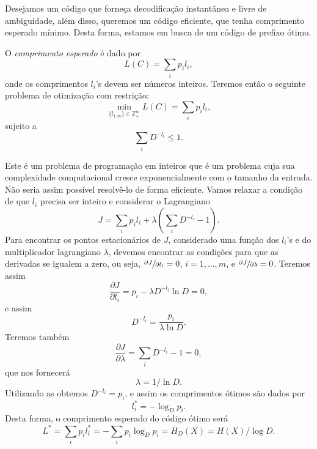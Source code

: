 Desejamos um código que forneça decodificação instantânea e livre de
ambiguidade, além disso, queremos um código eficiente, que tenha comprimento
esperado mínimo. Desta forma, estamos em busca de um código de prefixo ótimo.

O \emph{comprimento esperado} é dado por
\begin{equation}
  L(C) = \sum_{i} p_i l_i ,
\end{equation}
onde os comprimentos $l_i$'s devem ser números inteiros.
Teremos então o seguinte problema de otimização com restrição:
\begin{equation}
  \min_{\{l_{1:m}\} \in \mathbb{Z}_{+}^m} L(C) = \sum_i p_i l_i ,
\end{equation}
sujeito a
\begin{equation}
  \sum_i D^{-l_i} \leq 1 .
\end{equation}

Este é um problema de programação em inteiros que é um problema cuja
sua complexidade computacional cresce exponencialmente com o tamanho da entrada.
Não seria assim possível resolvê-lo de forma eficiente.
Vamos relaxar a condição de que $l_i$ precisa ser inteiro e considerar o Lagrangiano
\begin{equation}
  J = \sum_i p_i l_i + \lambda \left( \sum_i D^{-l_i} - 1 \right) .
\end{equation}
Para encontrar os pontos estacionários de $J$, considerado uma função dos $l_i$'s
e do multiplicador lagrangiano $\lambda$, devemos encontrar as condições para que
as derivadas se igualem a zero, ou seja, $\sfrac{\partial J}{\partial l_i} = 0$,
$i=1,\ldots,m$, e $\sfrac{\partial J}{\partial \lambda} = 0$. Teremos assim
\begin{equation}
  \frac{\partial J}{\partial l_i} = p_i - \lambda D^{-l_i} \ln D = 0 ,
\end{equation}
e assim
\begin{equation}\label{eq:codotDli}
  D^{-l_i} = \frac{p_i}{\lambda \ln D} .
\end{equation}
Teremos também
\begin{equation}
  \frac{\partial J}{\partial \lambda} = \sum_i D^{-l_i} - 1 = 0 ,
\end{equation}
que nos fornecerá
\begin{equation}\label{eq:codotlambda}
  \lambda = 1 / \ln D .
\end{equation}
Utilizando as  obtemos $D^{-l_i} = p_i$,
e assim os comprimentos ótimos são dados por
\begin{equation}\label{eq:codotli}
  l^\ast_i = -\log_D p_i .
\end{equation}
Desta forma, o comprimento esperado do código ótimo será
\begin{equation}\label{eq:codotLC}
  L^\ast = \sum_i p_i l_i^\ast = - \sum_i p_i \log_D p_i = H_D (X) = H(X) / \log D .
\end{equation}

